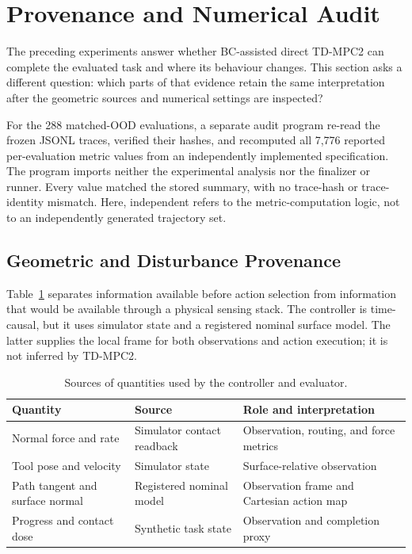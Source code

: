 \section{Provenance and Numerical Audit}
\label{sec:credibility_audit}

The preceding experiments answer whether BC-assisted direct TD-MPC2 can complete the
evaluated task and where its behaviour changes. This section asks a different
question: which parts of that evidence retain the same interpretation after
the geometric sources and numerical settings are inspected?

For the 288 matched-OOD evaluations, a separate audit program re-read the
frozen JSONL traces, verified their hashes, and recomputed all 7,776 reported
per-evaluation metric values from an independently implemented specification.
The program imports neither the experimental analysis nor the finalizer or
runner. Every value matched the stored summary, with no trace-hash or
trace-identity mismatch. Here, independent refers to the metric-computation
logic, not to an independently generated trajectory set.

\subsection{Geometric and Disturbance Provenance}

Table~\ref{tab:provenance} separates information available before action
selection from information that would be available through a physical sensing
stack. The controller is time-causal, but it uses simulator state and a
registered nominal surface model. The latter supplies the local frame for both
observations and action execution; it is not inferred by TD-MPC2.

\begin{table}[t]
\centering
\caption{Sources of quantities used by the controller and evaluator.}
\label{tab:provenance}
\footnotesize
\setlength{\tabcolsep}{3pt}
\begin{tabular}{@{}p{}p{}p{}@{}}
\toprule
Quantity & Source & Role and interpretation \\
\midrule
Normal force and rate & Simulator contact readback & Observation, routing, and force metrics \\
Tool pose and velocity & Simulator state & Surface-relative observation \\
Path tangent and surface normal & Registered nominal model & Observation frame and Cartesian action map \\
Progress and contact dose & Synthetic task state & Observation and completion proxy \\
\bottomrule
\end{tabular}
\end{table}

